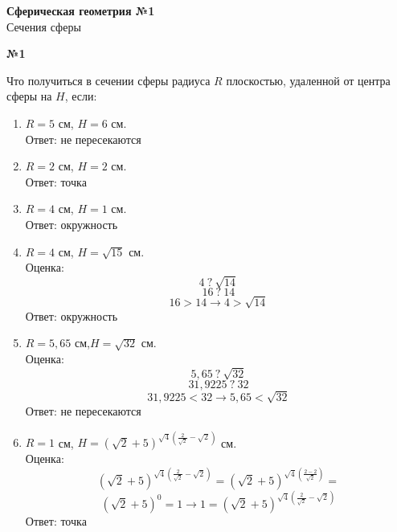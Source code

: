 


    \begin{center}
        \textbf{Сферическая геометрия №1}\\
        Сечения сферы
    \end{center}

    \begin{center}
        \textbf{№1}
    \end{center}

    Что получиться в сечении сферы радиуса $R$ плоскостью, удаленной от центра сферы на $H$, если:\\
    \begin{minipage}[t]{0.5\textwidth}
        \begin{enumerate}
            \setcounter{enumi}{0}
            \item $R = 5$ см, $H = 6$ см.\\
            Ответ: не пересекаются

            \item $R = 2$ см, $H = 2$ см.\\
            Ответ: точка

            \item $R = 4$ см, $H = 1$ см.\\
            Ответ: окружность

            \item $R = 4$ см, $H = \sqrt {15}$ см.\\
            Оценка:
            \[ 4 \ ? \ \sqrt{14} \]
            \[ 16 \ ? \ 14  \]
            \[ 16 > 14 \rightarrow 4 > \sqrt{14}  \]
            Ответ: окружность

            \item $R = 5,65$ см,$H = \sqrt{32}$ см.\\
            Оценка:
            \[ 5,65 \ ? \ \sqrt{32}\]
            \[ 31,9225 \ ? \ 32 \]
            \[ 31,9225 < 32 \rightarrow 5,65 < \sqrt{32}\]
            Ответ: не пересекаются

            \item $R = 1$ см, $H = (\sqrt{2} + 5)^{\sqrt{4}\left(\frac{2}{\sqrt{2}} - \sqrt{2}\right)}$ см.\\
            Оценка:
            \[  (\sqrt{2} + 5)^{\sqrt{4}\left(\frac{2}{\sqrt{2}} - \sqrt{2}\right)} =
            (\sqrt{2} + 5)^{\sqrt{4}\left(\frac{2 - 2}{\sqrt{2}}\right) }  =\]
            \[(\sqrt{2} + 5) ^ 0 = 1 \rightarrow 1 = (\sqrt{2} + 5)^{\sqrt{4}\left(\frac{2}{\sqrt{2}} - \sqrt{2}\right)}\]
            Ответ: точка
        \end{enumerate}
    \end{minipage}
